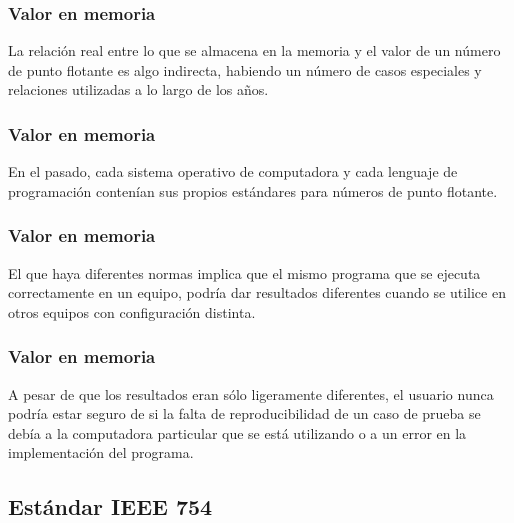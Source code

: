 \documentclass[12pt]{beamer}
\begin{document}
\begin{frame}
\frametitle{Valor en memoria}
La relación real entre lo que se almacena en la memoria y el valor de un número de punto flotante es algo indirecta, habiendo un número de casos especiales y relaciones utilizadas a lo largo de los años.
\end{frame}
\begin{frame}
\frametitle{Valor en memoria}
En el pasado, cada sistema operativo de computadora y cada lenguaje de programación contenían sus propios estándares para números de punto flotante.
\end{frame}
\begin{frame}
\frametitle{Valor en memoria}
El que haya diferentes normas implica que el mismo programa que se ejecuta correctamente en un equipo, podría dar resultados diferentes cuando se utilice en otros equipos con configuración distinta.
\end{frame}
\begin{frame}
\frametitle{Valor en memoria}
A pesar de que los resultados eran sólo ligeramente diferentes, el usuario nunca podría estar seguro de si la falta de reproducibilidad de un caso de prueba se debía a la computadora particular que se está utilizando o a un error en la implementación del programa.
\end{frame}

\subsection{Estándar IEEE 754}
\end{document}
